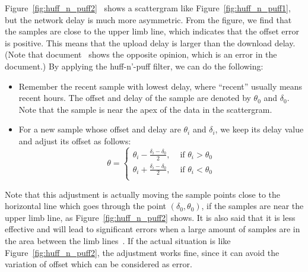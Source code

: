 Figure~\ref{fig:huff_n_puff2}~\cite{huff_n_puff} shows a scattergram like
Figure~\ref{fig:huff_n_puff1}, but the network delay is much more asymmetric.
From the figure, we find that the samples are close to the upper limb line,
which indicates that the offset error is positive. This means that the upload
delay is larger than the download delay. (Note that document~\cite{huff_n_puff}
shows the opposite opinion, which is an error in the
document.) By applying the huff-n'-puff filter, we can do the following:
\begin{itemize}
    \item 
        Remember the recent sample with lowest delay, where ``recent'' usually
        means recent hours. The offset and delay of the sample are denoted by 
        $\theta_0$ and $\delta_0$. Note that the sample is near the apex of the
        data in the scattergram.
    \item 
        For a new sample whose offset and delay are $\theta_i$ and
        $\delta_i$, we keep its delay value and adjust its offset as follows:
        \begin{equation}
            \theta = 
            \begin{cases}
                \displaystyle
                \theta_i - \frac{\delta_i - \delta_0}{2}, &\text{ if }\theta_i
                > \theta_0\\
                \displaystyle
                \theta_i + \frac{\delta_i - \delta_0}{2}, &\text{ if }\theta_i
                < \theta_0\\
            \end{cases}
            \label{eq:huff_n_puff}
        \end{equation}
\end{itemize}



Note that this adjustment is actually moving the sample points close to the
horizontal line which goes through the point $(\delta_0, \theta_0)$, if the
samples are near the upper limb line, as Figure~\ref{fig:huff_n_puff2} shows.
It is also said that it is less effective and will lead to significant errors
when a large amount of samples are in the area between the limb
lines~\cite{huff_n_puff}. If the actual situation is like
Figure~\ref{fig:huff_n_puff2}, the adjustment works fine, since it can avoid
the variation of offset which can be considered as error.


